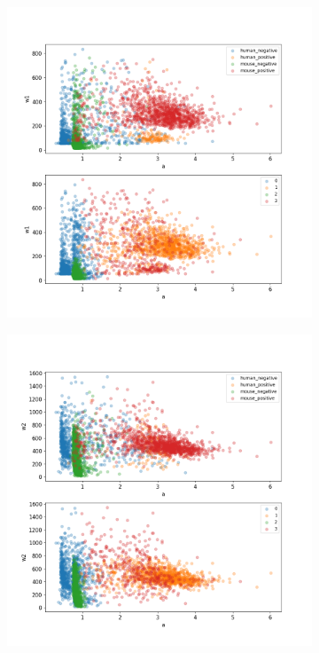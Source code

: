 \begin{figure}
\begin{subfigure}{0.45\textwidth}
	\end{subfigure}
	\hfill
	\begin{subfigure}{0.45\textwidth}
		\includegraphics[width=\textwidth]{fig/seperate_a_w1}
	\end{subfigure}
	\hfill
	\begin{subfigure}{0.45\textwidth}
		\includegraphics[width=\textwidth]{fig/seperate_a_w2}
	\end{subfigure}
	

\end{figure}
